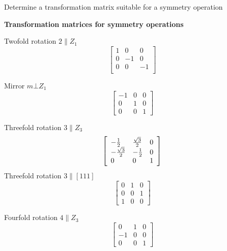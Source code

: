 
\begin {lo3} [Tensors]
Determine a transformation matrix suitable for a symmetry operation
\end {lo3}

{\bf Transformation matrices for symmetry operations}

Twofold rotation $2 \parallel Z_1$
\begin{equation*}
\left[
\begin{array}{lll}
1 & 0 & 0 \\
0 & -1 & 0 \\
0 & 0 & -1 \\
\end{array}
\right]
\end{equation*}

Mirror $m \bot Z_1$ 
\begin{equation*}
\left[
\begin{array}{lll}
-1 & 0 & 0 \\
0 & 1 & 0 \\
0 & 0 & 1 
\end{array}
\right]
\end{equation*}

Threefold rotation $3 \parallel Z_3$
\begin{equation*}
\left[
\begin{array}{lll}
-{1 \over 2} & {\sqrt{3} \over 2} & 0 \\
-{\sqrt{3} \over 2} & -{1 \over 2} & 0 \\
0 & 0 & 1 
\end{array}
\right]
\end{equation*}
Threefold rotation $3 \parallel [111]$
\begin{equation*}
\left[
\begin{array}{lll}
0 & 1 & 0 \\
0 & 0 & 1 \\
1 & 0 & 0 
\end{array}
\right]
\end{equation*}

Fourfold rotation $4 \parallel Z_3$
\begin{equation*}
\left[
\begin{array}{lll}
0 & 1 & 0 \\
-1 & 0 & 0 \\
0 & 0 & 1 
\end{array}
\right]
\end{equation*}

